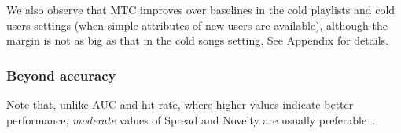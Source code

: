 
We also observe that MTC improves over baselines in the cold playlists
and cold users settings (when simple attributes of new users are available),
although the margin is not as big as that in the cold songs setting.
See Appendix for details.




%        
%        


\subsubsection{Beyond accuracy}

Note that, unlike AUC and hit rate,
where higher values indicate better performance,
\emph{moderate} values of Spread and Novelty are usually preferable~\cite{kluver2014evaluating,schedl2017}.

